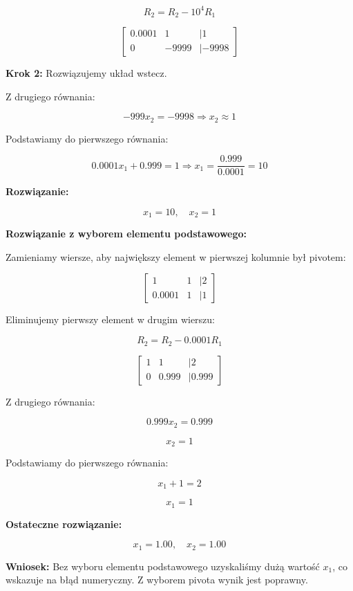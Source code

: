 \documentclass{article}
\begin{document}
\[
R_2 = R_2 - 10^4 R_1
\]

\[
\begin{bmatrix}
0.0001 & 1 & | 1 \\
0 & -9999 & | -9998
\end{bmatrix}
\]

\textbf{Krok 2:} Rozwiązujemy układ wstecz.

Z drugiego równania:

\[
-999 x_2 = -9998 \Rightarrow x_2 \approx 1
\]

Podstawiamy do pierwszego równania:

\[
0.0001 x_1 + 0.999 = 1 \Rightarrow x_1 = \frac{0.999}{0.0001} = 10
\]


\textbf{Rozwiązanie:}

\[
x_1 = 10, \quad x_2 = 1
\]

\textbf{Rozwiązanie z wyborem elementu podstawowego:}

Zamieniamy wiersze, aby największy element w pierwszej kolumnie był pivotem:

\[
\begin{bmatrix}
1 & 1 & | 2 \\
0.0001 & 1 & | 1
\end{bmatrix}
\]

Eliminujemy pierwszy element w drugim wierszu:

\[
R_2 = R_2 - 0.0001 R_1
\]

\[
\begin{bmatrix}
1 & 1 & | 2 \\
0 & 0.999 & | 0.999
\end{bmatrix}
\]

Z drugiego równania:

\[
0.999 x_2 = 0.999
\]

\[
x_2 = 1
\]

Podstawiamy do pierwszego równania:

\[
x_1 + 1 = 2
\]

\[
x_1 = 1
\]

\textbf{Ostateczne rozwiązanie:}

\[
x_1 = 1.00, \quad x_2 = 1.00
\]

\textbf{Wniosek:} Bez wyboru elementu podstawowego uzyskaliśmy dużą wartość \( x_1 \), co wskazuje na błąd numeryczny. Z wyborem pivota wynik jest poprawny.
\end{document}

